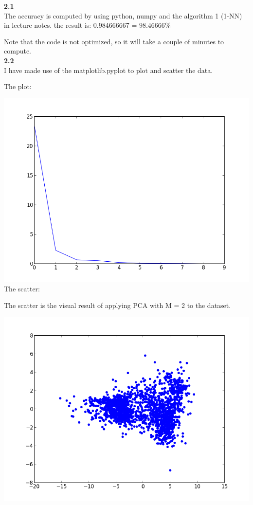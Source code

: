 \documentclass[12pt]{article}
\begin{document}
{\textbf{2.1}\\

The accuracy is computed by using python, numpy and the algorithm 1 (1-NN) in lecture notes.
the result is: 0.984666667 = $98.46666\%$

Note that the code is not optimized, so it will take a couple of minutes to compute.\\


\textbf{2.2}\\

I have made use of the matplotlib.pyplot to plot and scatter the data.

The plot:

\includegraphics[scale=0.5]{Plot.png}\\

The scatter:

The scatter is the visual result of applying PCA with M = 2 to the dataset. 

\includegraphics[scale=0.7]{scatter.png}\\

}
\end{document}
